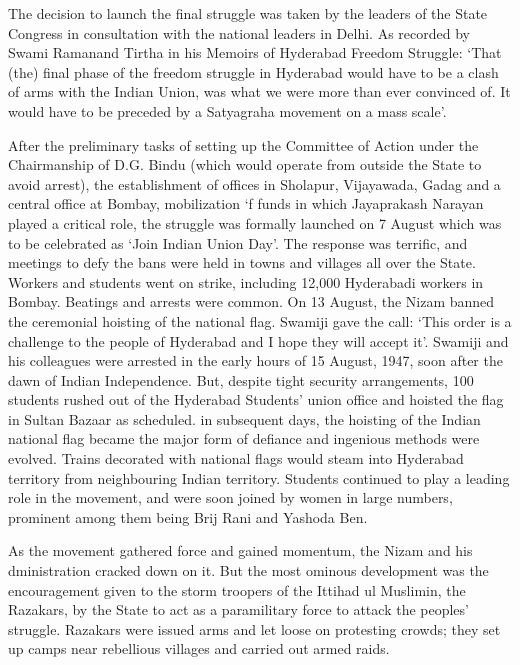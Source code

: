 The decision to launch the final struggle was taken by the leaders of the State Congress in consultation with the national leaders in Delhi. As recorded by Swami Ramanand Tirtha in his Memoirs of Hyderabad Freedom Struggle: `That (the) final phase of the freedom struggle in Hyderabad would have to be a clash of arms with the Indian Union, was what we were more than ever convinced of. It would have to be preceded by a Satyagraha movement on a mass scale'. 

After the preliminary tasks of setting up the Committee of Action under the Chairmanship of D.G. Bindu (which would operate from outside the State to avoid arrest), the establishment of offices in Sholapur, Vijayawada, Gadag and a central office at Bombay, mobilization `f funds in which Jayaprakash Narayan played a critical role, the struggle was formally launched on 7 August which was to be celebrated as `Join Indian Union Day'. The response was terrific, and meetings to defy the bans were held in towns and villages all over the State. Workers and students went on strike, including 12,000 Hyderabadi workers in Bombay. Beatings and arrests were common. On 13 August, the Nizam banned the ceremonial hoisting of the national flag. Swamiji gave the call: `This order is a challenge to the people of Hyderabad and I hope they will accept it'. Swamiji and his colleagues were arrested in the early hours of 15 August, 1947, soon after the dawn of Indian Independence. But, despite tight security arrangements, 100 students rushed out of the Hyderabad Students' union office and hoisted the flag in Sultan Bazaar as scheduled. in subsequent days, the hoisting of the Indian national flag became the major form of defiance and ingenious methods were evolved. Trains decorated with national flags would steam into Hyderabad territory from neighbouring Indian territory. Students continued to play a leading role in the movement, and were soon joined by women in large numbers, prominent among them being Brij Rani and Yashoda Ben. 

As the movement gathered force and gained momentum, the Nizam and his dministration cracked down on it. But the most ominous development was the encouragement given to the storm troopers of the Ittihad ul Muslimin, the Razakars, by the State to act as a paramilitary force to attack the peoples' struggle. Razakars were issued arms and let loose on protesting crowds; they set up camps near rebellious villages and carried out armed raids. 

